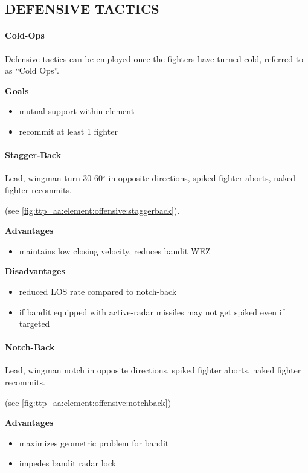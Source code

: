 \subsection{DEFENSIVE TACTICS}

\paragraph{Cold-Ops} 
Defensive tactics can be employed once the fighters have turned cold, 
referred to as ``Cold Ops''.

\medskip
\textbf{Goals}
\begin{itemize}
    \item mutual support within element
    \item recommit at least 1 fighter
\end{itemize}

\paragraph{Stagger-Back}
Lead, wingman turn 30-60$^\circ$ in opposite directions, 
spiked fighter aborts, naked fighter recommits.

\hfill(see \cref{fig:ttp_aa:element:offensive:staggerback}).

\bigskip
\textbf{Advantages}
\begin{itemize}
    \item maintains low closing velocity, 
    reduces bandit WEZ
\end{itemize}

\textbf{Disadvantages}
\begin{itemize}
    \item reduced LOS rate compared to notch-back
    \item if bandit equipped with active-radar missiles may not get spiked even if targeted
\end{itemize}

\paragraph{Notch-Back}
Lead, wingman notch in opposite directions, 
spiked fighter aborts, naked fighter recommits.

\hfill(see \cref{fig:ttp_aa:element:offensive:notchback})

\bigskip
\textbf{Advantages}
\begin{itemize}
    \item maximizes geometric problem for bandit
    \item impedes bandit radar lock
\end{itemize}

